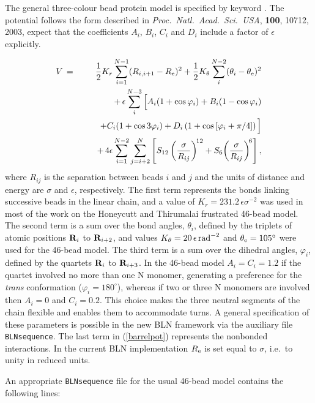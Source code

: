 {The general three-colour bead protein model is specified by keyword {}.
The potential follows the form described in
{\it Proc.~Natl.~Acad.~Sci.~USA}, {\bf 100}, 10712, 2003, expect that
the coefficients $A_i$, $B_i$, $C_i$ and $D_i$ include a factor of $\epsilon$
explicitly.

{\begin{eqnarray}
V&\,=\,&\frac{1}{2} K_r\sum_{i=1}^{N-1}(R_{i,i+1}-R_{\rm e})^2
 +\frac{1}{2} K_\theta\sum_i^{N-2}(\theta_i-\theta_{\rm e})^2 \nonumber\\
 &&+\,\epsilon\sum_i^{N-3}\Big[A_i(1+\cos\varphi_i)+B_i(1-\cos\varphi_i) \nonumber\\
  && \qquad +C_i(1+\cos3\varphi_i)+D_i\left(1+\cos\left[\varphi_i+\pi/4\right]\right)\Big] \nonumber\\
 &&+\,4\epsilon\sum_{i=1}^{N-2}\sum_{j=i+2}^N \left[S_{12}\left(\frac{\sigma}{R_{ij}}\right)^{\!12}
    +S_6\!\left(\frac{\sigma}{R_{ij}}\right)^{\!6}\right],
\label{barrelpot}
\end{eqnarray}}
\noindent where $R_{ij}$ is the separation between beads $i$ and $j$ and
the units of distance and energy are $\sigma$ and $\epsilon$, respectively.
The first term represents the bonds linking successive beads in the linear chain, and a 
value of $K_r=231.2\,\epsilon\sigma^{-2}$ was used in most of the work on the 
Honeycutt and Thirumalai frustrated 46-bead model.
The second term is a sum over the bond angles, $\theta_i$, defined by the triplets
of atomic positions ${\bf R}_i$ to ${\bf R}_{i+2}$, and values
$K_\theta=20\,\epsilon\,{\rm rad}^{-2}$ and $\theta_{\rm e}=105^\circ$ were
used for the 46-bead model.
The third term
is a sum over the dihedral angles, $\varphi_i$, defined by the quartets ${\bf R}_i$ to
${\bf R}_{i+3}$. 
In the 46-bead model $A_i=C_i=1.2$ if the quartet involved no more than one N monomer, generating
a preference for the {\it trans\/} conformation ($\varphi_i=180^\circ$), whereas if two or three
N monomers are involved then $A_i=0$ and $C_i=0.2$.
This choice makes the three neutral
segments of the chain flexible and enables them to accommodate turns.
A general specification of these parameters is possible in the new BLN framework
via the auxiliary file {\tt BLNsequence}.
The last term in (\ref{barrelpot}) represents the nonbonded interactions.
In the current BLN implementation $R_{\rm e}$ is set equal to $\sigma$, i.e.~to 
unity in reduced units.

An appropriate {\tt BLNsequence} file for the usual 46-bead model contains the following
lines:

}
